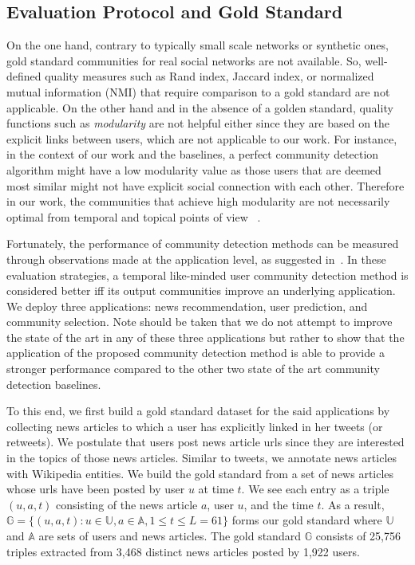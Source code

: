 \documentclass[sigconf]{acmart}
\begin{document}
\subsection{Evaluation Protocol and Gold Standard}
On the one hand, contrary to typically small scale networks or synthetic ones, gold standard communities for real social networks are not available. So, well-defined quality measures such as Rand index, Jaccard index, or normalized mutual information (NMI) that require comparison to a gold standard are not applicable. On the other hand and in the absence of a golden standard, quality functions such as \textit{modularity} are not helpful either since they are based on the explicit links between users, which are not applicable to our work. For instance, in the context of our work and the baselines, a perfect community detection algorithm might have a low modularity value as those users that are deemed most similar might not have explicit social connection with each other. Therefore in our work, the communities that achieve high modularity are not necessarily optimal from temporal and topical points of view ~\cite{Moradi2012}. 

Fortunately, the performance of community detection methods can be measured through observations made at the application level, as suggested in~\cite{DBLP:conf/sigmod/HuYCX15, Moradi2012}. In these evaluation strategies, a temporal like-minded user community detection method is considered better iff its output communities improve an underlying application. We deploy three applications: news recommendation, user prediction, and community selection. Note should be taken that we do not attempt to improve the state of the art in any of these three applications but rather to show that the application of the proposed community detection method is able to provide a stronger performance compared to the other two state of the art community detection baselines. 

To this end, we first build a gold standard dataset for the said applications by collecting news articles to which a user has explicitly linked in her tweets (or retweets). We postulate that users post news article urls since they are interested in the topics of those news articles. Similar to tweets, we annotate news articles with Wikipedia entities. We build the gold standard from a set of news articles whose urls have been posted by user $u$ at time $t$. We see each entry as a triple $(u, a, t)$ consisting of the news article $a$, user $u$, and the time $t$. As a result, $\mathbb{G}=\{(u,a,t): u\in\mathbb{U},a\in\mathbb{A},1\leq{t}\leq{L=61}\}$ forms our gold standard where $\mathbb{U}$ and $\mathbb{A}$ are sets of users and news articles. The gold standard $\mathbb{G}$ consists of 25,756 triples extracted from 3,468 distinct news articles posted by 1,922 users.
\end{document}
